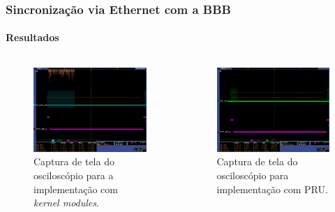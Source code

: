 \documentclass{beamer}
\begin{document}
\begin{frame}
\frametitle{Sincronização via Ethernet com a BBB }
\framesubtitle{Resultados}

\vspace{-24pt}

\begin{columns}

\begin{column}{.5\textwidth}

\begin{figure}[h!]
\centering
\includegraphics[scale=0.16]{image/tek_com_threads}
\caption {\centering Captura de tela do osciloscópio para a implementação com
\textit{kernel modules}.}
\label{fig:osciloscopio_thread}
\end{figure}
\end{column}
		  
\begin{column}{.5\textwidth}

\begin{figure}[h!]
\centering
\includegraphics[scale=0.16]{image/tek_pru}
\caption {\centering Captura de tela do osciloscópio para implementação com
PRU.}
\label{fig:pru_osciloscopio_thread}
\end{figure}
\end{column}

\end{columns}
\end{frame}
\end{document}
